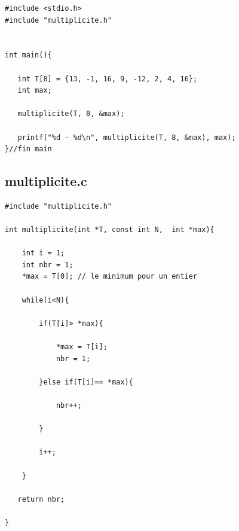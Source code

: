 \documentclass[a4paper, 11pt, oneside]{article}
\begin{document}
\begin{lstlisting}[caption={Main.c}]
#include <stdio.h>
#include "multiplicite.h"


int main(){

   int T[8] = {13, -1, 16, 9, -12, 2, 4, 16};
   int max;

   multiplicite(T, 8, &max);

   printf("%d - %d\n", multiplicite(T, 8, &max), max);
}//fin main
\end{lstlisting}


\subsection{multiplicite.c}

\begin{lstlisting}[caption={multiplicite.c}]
#include "multiplicite.h"

int multiplicite(int *T, const int N,  int *max){
   
    int i = 1;
    int nbr = 1;
    *max = T[0]; // le minimum pour un entier 

    while(i<N){

        if(T[i]> *max){

            *max = T[i];
            nbr = 1;

        }else if(T[i]== *max){

            nbr++;

        }

        i++;

    }

   return nbr;

}
\end{lstlisting}
\end{document}
